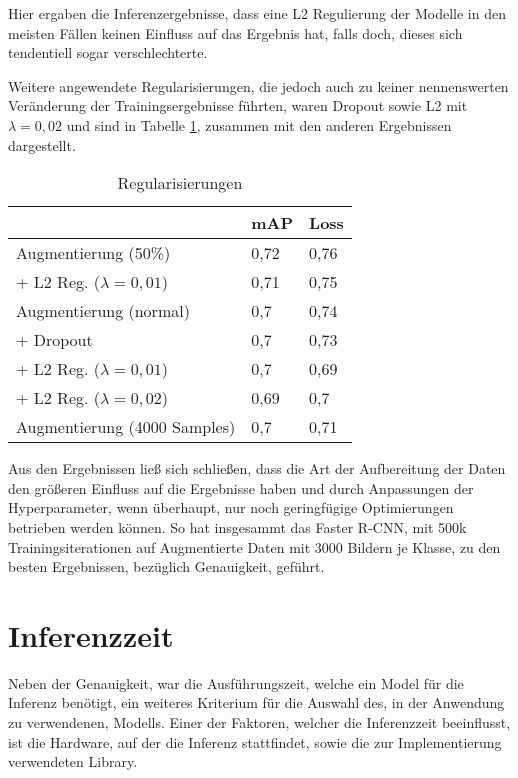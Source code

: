 Hier ergaben die Inferenzergebnisse, dass 
eine L2 Regulierung der Modelle
in den meisten Fällen keinen Einfluss auf das Ergebnis
hat, falls doch, dieses sich tendentiell sogar
verschlechterte.

Weitere angewendete Regularisierungen, die jedoch 
auch zu keiner nennenswerten Veränderung der Trainingsergebnisse
führten, waren Dropout sowie L2 mit $\lambda = 0,02$ und sind in 
Tabelle \ref{table:reg}, zusammen mit den anderen Ergebnissen
dargestellt.


\vspace{1cm}
\begin{table}[htb]
  \centering
  \begin{tabular}{m{}|m{}<{\centering}m{}<{\centering}}
  \hline
                    & mAP  & Loss  \\ \hline\hline
  Augmentierung (50\%) &  0,72    &    0,76   \\
   + L2 Reg. ($\lambda = 0,01$)            &   0,71     & 0,75       \\\hline
  Augmentierung (normal)     & 0,7  & 0,74            \\
  + Dropout          & 0,7  & 0,73            \\
  + L2 Reg. ($\lambda = 0,01$)    & 0,7  & 0,69            \\
  + L2 Reg. ($\lambda = 0,02$)    & 0,69 & 0,7             \\ \hline
  Augmentierung (4000 Samples) &0,7&0,71\\\hline
  \end{tabular}
  \caption{Regularisierungen}
  \label{table:reg}
\end{table}
\vspace{1cm}

Aus den Ergebnissen ließ sich schließen, dass die Art
der Aufbereitung der Daten den größeren Einfluss auf die Ergebnisse
haben und durch Anpassungen der Hyperparameter, wenn überhaupt,
nur noch geringfügige Optimierungen betrieben werden können.
So hat insgesammt das Faster R-CNN, mit 500k Trainingsiterationen 
auf Augmentierte Daten mit 3000 Bildern je Klasse, zu
den besten Ergebnissen, bezüglich Genauigkeit, geführt.


\section{Inferenzzeit}\label{sec:infertime}

Neben der Genauigkeit, war die Ausführungszeit, welche ein Model für die 
Inferenz benötigt, ein weiteres Kriterium für die Auswahl des, in 
der Anwendung zu verwendenen, Modells.
Einer der Faktoren, welcher die Inferenzzeit beeinflusst,
ist die Hardware, auf der die Inferenz stattfindet,
sowie die zur Implementierung verwendeten Library.

